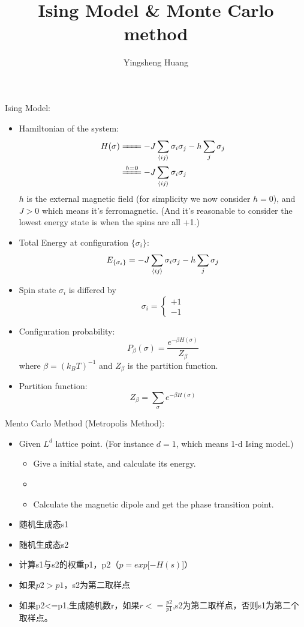 \documentclass{article}
\title{Ising Model \& Monte Carlo method}
\author{Yingsheng Huang}
\newcommand{\s}{\sigma}
\begin{document}
\maketitle
Ising Model:
\begin{itemize}
  \item Hamiltonian of the system:
  \begin{align*}
    H(\sigma)&\xlongequal{\phantom{h=0}}-J\sum_{\expval{ij}}\sigma_i\sigma_j-h\sum_{j}\sigma_j\\
    &\xlongequal{h=0}-J\sum_{\expval{ij}}\sigma_i\sigma_j
  \end{align*}
  $h$ is the external magnetic field (for simplicity we now consider $h=0$), and $J>0$ which means it's ferromagnetic. (And it's reasonable to consider the lowest energy state is when the spins are all +1.)
  \item Total Energy at configuration $\{\sigma_i \}$:
  $$E_{\{\sigma_i\}}=-J\sum_{\expval{ij}}\sigma_i\sigma_j-h\sum_{j}\sigma_j$$
  \item Spin state $\sigma_i$ is differed by
  $$\sigma_i=\begin{cases}
  +1\\-1
  \end{cases}$$
  \item Configuration probability:
  $$P_{\beta}(\s)=\frac{e^{-\beta H(\s)}}{Z_{\beta}}$$
  where $\beta=(k_BT)^{-1}$ and $Z_{\beta}$ is the partition function.
  \item Partition function:
  $$Z_{\beta}=\sum_{\sigma}e^{-\beta H(\sigma)}$$


\end{itemize}
Mento Carlo Method (Metropolis Method):
\begin{itemize}
  \item Given $L^d$ lattice point. (For instance $d=1$, which means 1-d Ising model.)

  \begin{itemize}{(1)}
    \item Give a initial state, and calculate its energy.
    \item
    \item Calculate the magnetic dipole and get the phase transition point.
  \end{itemize}
\end{itemize}


\begin{itemize}[1.]
  \item 随机生成态s1
  \item 随机生成态s2
  \item 计算s1与s2的权重p1，p2（$p=exp[-H(s)$]）
  \item 如果$p2>p1$，s2为第二取样点
  \item 如果p2<=p1,生成随机数r，如果$r<=\frac{p2}{p1}$,s2为第二取样点，否则s1为第二个取样点。
\end{itemize}
\end{document}
